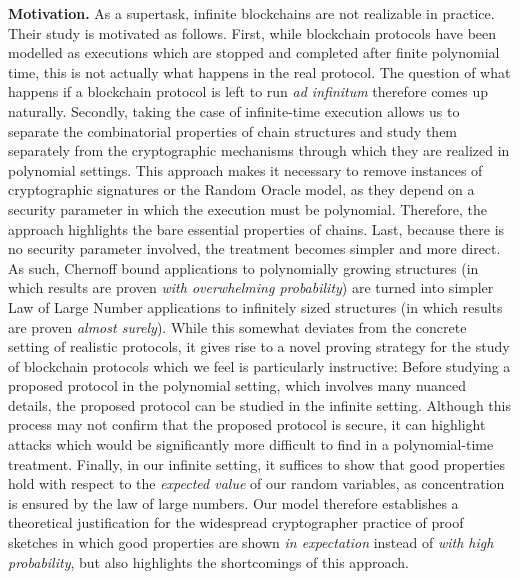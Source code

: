 \noindent
\textbf{Motivation.}
As a supertask, infinite blockchains are not realizable in practice. Their study
is motivated as follows. First, while blockchain protocols have been modelled as
executions which are stopped and completed after finite polynomial time, this is
not actually what happens in the real protocol. The question of what happens if
a blockchain protocol is left to run \emph{ad infinitum} therefore comes up
naturally. Secondly, taking the case of infinite-time execution allows us to
separate the combinatorial properties of chain structures and study them
separately from the cryptographic mechanisms through which they are realized in
polynomial settings. This approach makes it necessary to remove instances of
cryptographic signatures or the Random Oracle model, as they depend on a
security parameter in which the execution must be polynomial. Therefore, the
approach highlights the bare essential properties of chains. Last, because there
is no security parameter involved, the treatment becomes simpler and more
direct. As such, Chernoff bound applications to polynomially growing structures
(in which results are proven \emph{with overwhelming probability}) are turned
into simpler Law of Large Number applications to infinitely sized structures (in
which results are proven \emph{almost surely}). While this somewhat deviates
from the concrete setting of realistic protocols, it gives rise to a novel
proving strategy for the study of blockchain protocols which we feel is
particularly instructive: Before studying a proposed protocol in the polynomial
setting, which involves many nuanced details, the proposed protocol can be
studied in the infinite setting. Although this process may not confirm that the
proposed protocol is secure, it can highlight attacks which would be
significantly more difficult to find in a polynomial-time treatment. Finally,
in our infinite setting, it suffices to show that good properties hold with
respect to the \emph{expected value} of our random variables, as concentration
is ensured by the law of large numbers. Our model therefore establishes a
theoretical justification for the widespread cryptographer practice of proof
sketches in which good properties are shown \emph{in expectation} instead of
\emph{with high probability}, but also highlights the shortcomings of this
approach.
